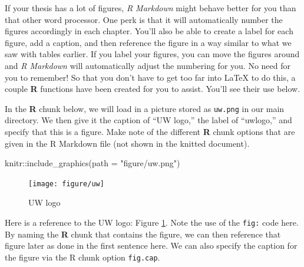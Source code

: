 \documentclass [11pt, proquest] {uwthesis}[2015/03/03]
\newenvironment{Shaded}{\begin{snugshade}}{\end{snugshade}}
\newcommand{\AttributeTok}[1]{\textcolor[rgb]{0.77,0.63,0.00}{#1}}
\newcommand{\FunctionTok}[1]{\textcolor[rgb]{0.00,0.00,0.00}{#1}}
\newcommand{\NormalTok}[1]{#1}
\newcommand{\SpecialCharTok}[1]{\textcolor[rgb]{0.00,0.00,0.00}{#1}}
\newcommand{\StringTok}[1]{\textcolor[rgb]{0.31,0.60,0.02}{#1}}
\begin{document}
If your thesis has a lot of figures, \emph{R Markdown} might behave better for you than that other word processor. One perk is that it will automatically number the figures accordingly in each chapter. You'll also be able to create a label for each figure, add a caption, and then reference the figure in a way similar to what we saw with tables earlier. If you label your figures, you can move the figures around and \emph{R Markdown} will automatically adjust the numbering for you. No need for you to remember! So that you don't have to get too far into LaTeX to do this, a couple \textbf{R} functions have been created for you to assist. You'll see their use below.

In the \textbf{R} chunk below, we will load in a picture stored as \texttt{uw.png} in our main directory. We then give it the caption of ``UW logo,'' the label of ``uwlogo,'' and specify that this is a figure. Make note of the different \textbf{R} chunk options that are given in the R Markdown file (not shown in the knitted document).
\begin{Shaded}
\begin{Highlighting}[]
\NormalTok{knitr}\SpecialCharTok{::}\FunctionTok{include\_graphics}\NormalTok{(}\AttributeTok{path =} \StringTok{"figure/uw.png"}\NormalTok{)}
\end{Highlighting}
\end{Shaded}
\begin{figure}
\texttt{[image: figure/uw]} \caption{UW logo}\label{fig:uwlogo}
\end{figure}
Here is a reference to the UW logo: Figure \ref{fig:uwlogo}. Note the use of the \texttt{fig:} code here. By naming the \textbf{R} chunk that contains the figure, we can then reference that figure later as done in the first sentence here. We can also specify the caption for the figure via the R chunk option \texttt{fig.cap}.

\clearpage
\end{document}
